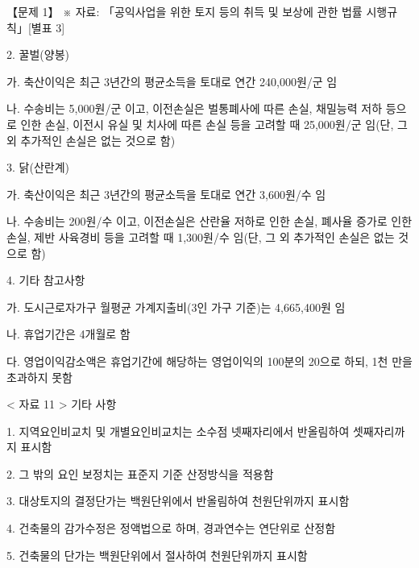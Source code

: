 \begin{longquestion}{【문제 1】}
※ 자료: 「공익사업을 위한 토지 등의 취득 및 보상에 관한 법률 시행규칙」[별표 3] \par
2. 꿀벌(양봉) \par
가. 축산이익은 최근 3년간의 평균소득을 토대로 연간 240,000원/군 임 \par
나. 수송비는 5,000원/군 이고, 이전손실은 벌통폐사에 따른 손실, 채밀능력 저하 등으로 인한 손실, 이전시 유실 및 치사에 따른 손실 등을 고려할 때 25,000원/군 임(단, 그 외 추가적인 손실은 없는 것으로 함) \par
3. 닭(산란계) \par
가. 축산이익은 최근 3년간의 평균소득을 토대로 연간 3,600원/수 임 \par
나. 수송비는 200원/수 이고, 이전손실은 산란율 저하로 인한 손실, 폐사율 증가로 인한 손실, 제반 사육경비 등을 고려할 때 1,300원/수 임(단, 그 외 추가적인 손실은 없는 것으로 함) \par
4. 기타 참고사항 \par
가. 도시근로자가구 월평균 가계지출비(3인 가구 기준)는 4,665,400원 임 \par
나. 휴업기간은 4개월로 함 \par
다. 영업이익감소액은 휴업기간에 해당하는 영업이익의 100분의 20으로 하되, 1천 만을 초과하지 못함 \par
< 자료 11 > 기타 사항 \par
1. 지역요인비교치 및 개별요인비교치는 소수점 넷째자리에서 반올림하여 셋째자리까지 표시함 \par
2. 그 밖의 요인 보정치는 표준지 기준 산정방식을 적용함 \par
3. 대상토지의 결정단가는 백원단위에서 반올림하여 천원단위까지 표시함 \par
4. 건축물의 감가수정은 정액법으로 하며, 경과연수는 연단위로 산정함 \par
5. 건축물의 단가는 백원단위에서 절사하여 천원단위까지 표시함 \par
\end{longquestion}
